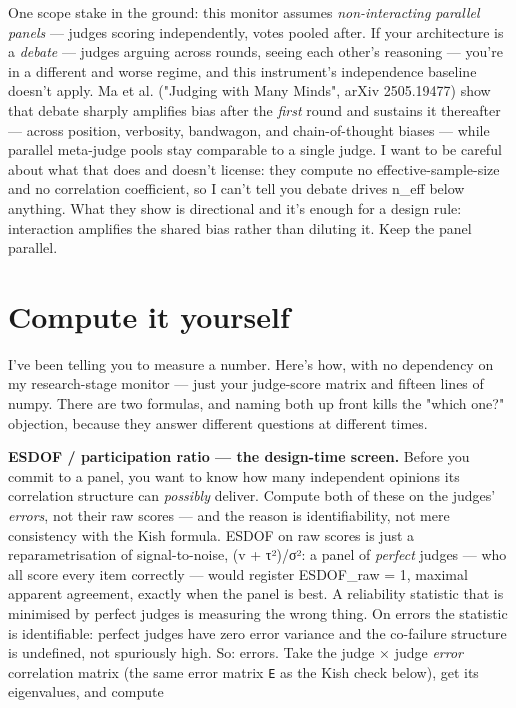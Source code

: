 \documentclass[11pt]{article}
\begin{document}
One scope stake in the ground: this monitor assumes \emph{non-interacting parallel panels} — judges scoring independently, votes pooled after. If your architecture is a \emph{debate} — judges arguing across rounds, seeing each other's reasoning — you're in a different and worse regime, and this instrument's independence baseline doesn't apply. Ma et al. ("Judging with Many Minds", arXiv 2505.19477) show that debate sharply amplifies bias after the \emph{first} round and sustains it thereafter — across position, verbosity, bandwagon, and chain-of-thought biases — while parallel meta-judge pools stay comparable to a single judge. I want to be careful about what that does and doesn't license: they compute no effective-sample-size and no correlation coefficient, so I can't tell you debate drives n\_eff below anything. What they show is directional and it's enough for a design rule: interaction amplifies the shared bias rather than diluting it. Keep the panel parallel.

\section*{Compute it yourself}

I've been telling you to measure a number. Here's how, with no dependency on my research-stage monitor — just your judge-score matrix and fifteen lines of numpy. There are two formulas, and naming both up front kills the "which one?" objection, because they answer different questions at different times.

\textbf{ESDOF / participation ratio — the design-time screen.} Before you commit to a panel, you want to know how many independent opinions its correlation structure can \emph{possibly} deliver. Compute both of these on the judges' \emph{errors}, not their raw scores — and the reason is identifiability, not mere consistency with the Kish formula. ESDOF on raw scores is just a reparametrisation of signal-to-noise, (v + τ²)/σ²: a panel of \emph{perfect} judges — who all score every item correctly — would register ESDOF\_raw = 1, maximal apparent agreement, exactly when the panel is best. A reliability statistic that is minimised by perfect judges is measuring the wrong thing. On errors the statistic is identifiable: perfect judges have zero error variance and the co-failure structure is undefined, not spuriously high. So: errors. Take the judge × judge \emph{error} correlation matrix (the same error matrix \texttt{E} as the Kish check below), get its eigenvalues, and compute
\end{document}
